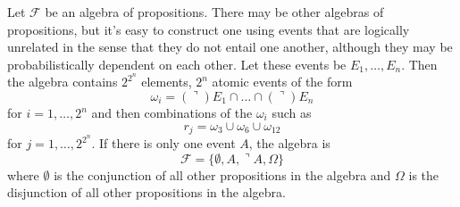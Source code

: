 \documentclass[12pt]{article}
\begin{document}
Let $\mathcal{F}$ be an algebra of propositions. There may be other
algebras of propositions, but it's easy to construct one using
events that are logically unrelated in the sense that they do not
entail one another, although they may be probabilistically dependent
on each other. Let these events be $E_{1},{\ldots},E_{n}$. Then the
algebra contains $2^{2^{n}}$ elements, $2^{n}$ atomic events of the
form
\begin{equation}
  \label{eq:mahpoogh}
  \omega_{i}=(\urcorner)E_{1}\cap{\ldots}\cap(\urcorner)E_{n}
\end{equation}
for $i=1,{\ldots},2^{n}$ and then combinations of the $\omega_{i}$
such as
\begin{equation}
  \label{eq:aikaerei}
  r_{j}=\omega_{3}\cup\omega_{6}\cup\omega_{12}
\end{equation}
for $j=1,{\ldots},2^{2^{n}}$. If there is only one event $A$, the
algebra is 
\begin{equation}
  \label{eq:shiegaev}
  \mathcal{F}=\{\emptyset,A,\urcorner{}A,\Omega\}
\end{equation}
where $\emptyset$ is the conjunction of all other propositions in the
algebra and $\Omega$ is the disjunction of all other propositions in
the algebra.
\end{document}
